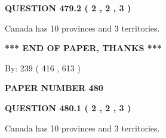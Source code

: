\documentclass[12pt]{article}
\begin{document}
 
  
\vspace{0.2in}
  
{\textbf{\Large{QUESTION
479.2 
 ( 2 , 2 , 3 )
}}}
  
  
 
 
\noindent{}
 
 
Canada has 10  provinces and 3 territories.
 
 
 
 
   
   
 \vspace{0.2in}
 
   
   
   
   
\vspace{1.0in} 
{\textbf{\large{ *** END OF PAPER, THANKS *** }}} 
   
   
\hspace{1.0in} By: 
 239 ( 416 ,  613 )
   
   
   
   
\newpage 
\setcounter{page}{ 
   480001 } 
   
   
   
   
 {\textbf{ \Large{ PAPER NUMBER  480  }}}
   
   
\vspace{0.2in}
   
   
   
   
   
   
 \vspace{0.2in}
 
 
 
 
   
   
  
\vspace{0.2in}
  
{\textbf{\Large{QUESTION
480.1 
 ( 2 , 2 , 3 )
}}}
  
  
 
 
\noindent{}
 
 
Canada has 10  provinces and 3 territories.
 
 
 
 
  
\vspace{0.2in}
  
\end{document}

